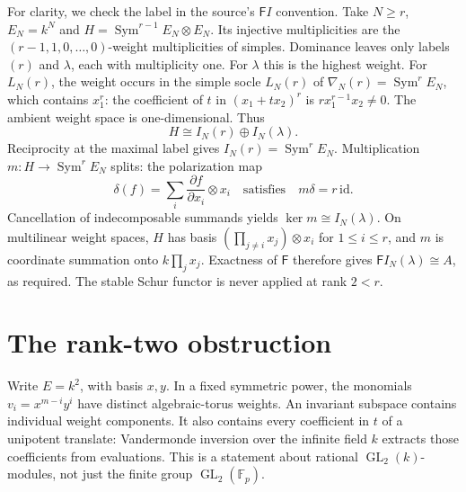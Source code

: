 \documentclass[11pt]{article}
\newcommand{\GL}{\operatorname{GL}}
\newcommand{\Sym}{\operatorname{Sym}}
\begin{document}
For clarity, we check the label in the source's \(\mathsf F I\) convention.
Take \(N\ge r\), \(E_N=k^N\) and
\(H=\Sym^{r-1}E_N\otimes E_N\).
Its injective multiplicities are the \((r-1,1,0,\ldots,0)\)-weight
multiplicities of simples. Dominance leaves only labels \((r)\) and
\(\lambda\), each with multiplicity one. For \(\lambda\) this is the highest
weight. For \(L_N(r)\), the weight occurs in the simple socle \(L_N(r)\) of
\(\nabla_N(r)=\Sym^r E_N\), which contains \(x_1^r\): the coefficient of \(t\) in
\((x_1+t x_2)^r\) is \(r x_1^{r-1}x_2\ne0\).
The ambient weight space is one-dimensional.
Thus
\[
 H\cong I_N(r)\oplus I_N(\lambda).
\]
Reciprocity at the maximal label gives \(I_N(r)=\Sym^r E_N\).
Multiplication \(m:H\to\Sym^r E_N\) splits: the polarization map
\[
 \delta(f)=\sum_i \frac{\partial f}{\partial x_i}\otimes x_i
 \quad\text{satisfies}\quad m\delta=r\,\mathrm{id}.
\]
Cancellation of indecomposable summands yields \(\ker m\cong I_N(\lambda)\).
On multilinear weight spaces, \(H\) has basis
\((\prod_{j\ne i}x_j)\otimes x_i\) for \(1\le i\le r\), and \(m\) is
coordinate summation onto \(k\prod_jx_j\). Exactness of \(\mathsf F\)
therefore gives \(\mathsf F I_N(\lambda)\cong A\), as required.
The stable Schur functor is never applied at rank \(2<r\).

\section{The rank-two obstruction}
Write \(E=k^2\), with basis \(x,y\). In a fixed symmetric power,
the monomials \(v_i=x^{m-i}y^i\) have distinct algebraic-torus weights.
An invariant subspace contains individual weight components.
It also contains every coefficient in \(t\) of a unipotent translate:
Vandermonde inversion over the infinite field \(k\) extracts those
coefficients from evaluations. This is a statement about rational
\(\GL_2(k)\)-modules, not just the finite group \(\GL_2(\mathbb F_p)\).
\end{document}
